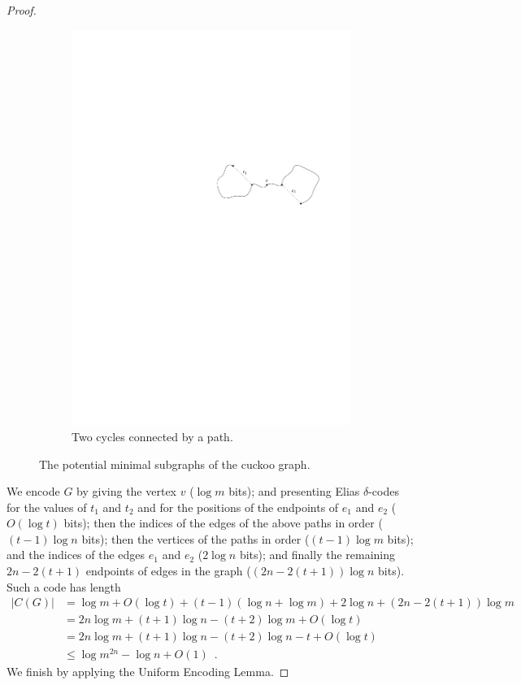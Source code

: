 \documentclass[format=acmsmall, review=false, screen=true]{acmart}
\begin{document}
\begin{proof}
\begin{figure}
\begin{subfigure}[b]{0.6\textwidth}
      \includegraphics[scale=0.8]{cuckoo2}
      \caption{Two cycles connected by a path.}
    \end{subfigure}
    \caption{The potential minimal subgraphs of the cuckoo graph.}
  \end{figure}

  We encode $G$ by giving the vertex $v$ ($\log m$ bits); and presenting Elias
  $\delta$-codes for the values of $t_1$ and $t_2$ and for the
  positions of the endpoints of $e_1$ and $e_2$ ($O(\log t)$ bits); then the indices
  of the edges of
  the above paths in order ($(t-1)\log n$ bits); then the vertices of the paths in 
  order ($(t-1)\log m$ bits);
  and the indices of the edges $e_1$ and $e_2$ ($2 \log n$ bits); and finally the 
  remaining $2n - 2(t + 1)$ endpoints of edges in the graph
  ($(2n - 2(t + 1))\log n$ bits). Such a code has length
  \begin{align*}
    |C(G)| &= \log m + O(\log t) + (t - 1)(\log n + \log m) + 2\log n + (2n - 2(t + 1))\log m \\
           &= 2n \log m + (t + 1) \log n - (t + 2) \log m + O(\log t) \\
           &= 2n \log m + (t + 1) \log n - (t + 2) \log n - t + O(\log t) \tag{since $m = 2n$} \\
           &\le \log m^{2n} - \log n + O(1) \enspace .
  \end{align*}
  We finish by applying the Uniform Encoding Lemma.
\end{proof}
\end{document}
